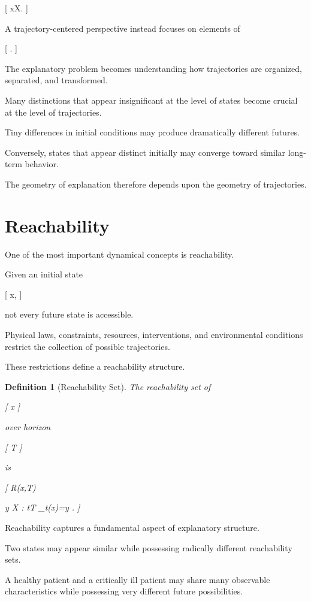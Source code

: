 \documentclass[11pt,oneside,openany]{book}
\newtheorem{definition}{Definition}[chapter] \newtheorem{theorem}{Theorem}[chapter] \newtheorem{proposition}{Proposition}[chapter] \newtheorem{lemma}{Lemma}[chapter] \newtheorem{corollary}{Corollary}[chapter] \newtheorem{remark}{Remark}[chapter]
\begin{document}
[
x\in\mathcal X.
]

A trajectory-centered perspective instead focuses on elements of

[
\Gamma.
]

The explanatory problem becomes understanding how trajectories are organized, separated, and transformed.

Many distinctions that appear insignificant at the level of states become crucial at the level of trajectories.

Tiny differences in initial conditions may produce dramatically different futures.

Conversely, states that appear distinct initially may converge toward similar long-term behavior.

The geometry of explanation therefore depends upon the geometry of trajectories.

\section{Reachability}

One of the most important dynamical concepts is reachability.

Given an initial state

[
x,
]

not every future state is accessible.

Physical laws, constraints, resources, interventions, and environmental conditions restrict the collection of possible trajectories.

These restrictions define a reachability structure.

\begin{definition}[Reachability Set]

The reachability set of

[
x
]

over horizon

[
T
]

is

[
R(x,T)

{
y
\in
\mathcal X
:
\exists t\le T
\Phi_t(x)=y
}.
]

\end{definition}

Reachability captures a fundamental aspect of explanatory structure.

Two states may appear similar while possessing radically different reachability sets.

A healthy patient and a critically ill patient may share many observable characteristics while possessing very different future possibilities.
\end{document}
